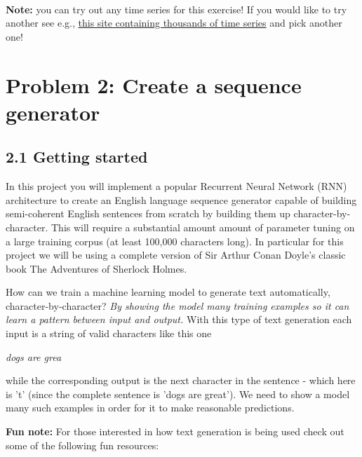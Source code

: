 \documentclass[11pt]{article}
\begin{document}
    \begin{center}
    \end{center}
    { \hspace*{\fill} \\}
    
    \textbf{Note:} you can try out any time series for this exercise! If you
would like to try another see e.g.,
\href{https://datamarket.com/data/list/?q=provider\%3Atsdl}{this site
containing thousands of time series} and pick another one!

    \section{Problem 2: Create a sequence
generator}\label{problem-2-create-a-sequence-generator}

    \subsection{2.1 Getting started}\label{getting-started}

In this project you will implement a popular Recurrent Neural Network
(RNN) architecture to create an English language sequence generator
capable of building semi-coherent English sentences from scratch by
building them up character-by-character. This will require a substantial
amount amount of parameter tuning on a large training corpus (at least
100,000 characters long). In particular for this project we will be
using a complete version of Sir Arthur Conan Doyle's classic book The
Adventures of Sherlock Holmes.

How can we train a machine learning model to generate text
automatically, character-by-character? \emph{By showing the model many
training examples so it can learn a pattern between input and output.}
With this type of text generation each input is a string of valid
characters like this one

\emph{dogs are grea}

while the corresponding output is the next character in the sentence -
which here is 't' (since the complete sentence is 'dogs are great'). We
need to show a model many such examples in order for it to make
reasonable predictions.

\textbf{Fun note:} For those interested in how text generation is being
used check out some of the following fun resources:
\end{document}
